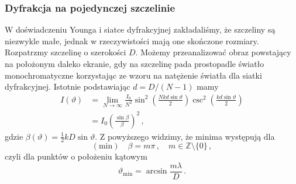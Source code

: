 \documentclass[../main.tex]{subfiles}
\begin{document}
\subsubsection{Dyfrakcja na pojedynczej szczelinie}
W doświadczeniu Younga i siatce dyfrakcyjnej zakładaliśmy, że szczeliny są niezwykle małe, jednak w
rzeczywistości mają one skończone rozmiary. Rozpatrzmy szczelinę o szerokości \(D\). Możemy
przeanalizować obraz powstający na położonym daleko ekranie, gdy na szczelinę pada prostopadle
światło monochromatyczne korzystając ze wzoru na natężenie światła dla siatki dyfrakcyjnej. Istotnie
podstawiając \(d=D/(N-1)\) mamy 
\begin{equation*}
\begin{split}
    I(\vartheta)&=\lim_{N\to\infty}\frac{I_0}{N^2}\sin^2\left(\frac{Nkd\sin\vartheta}{2}\right)\csc^2\left(\frac{kd\sin\vartheta}{2}\right)\\
    &=I_0\left(\frac{\sin\beta}{\beta}\right)^2\,,
\end{split}
\end{equation*}
gdzie \(\beta(\vartheta)=\frac{1}{2}kD\sin\vartheta\). Z powyższego widzimy, że minima występują dla 
\begin{equation*}
    (\text{min})\quad \beta=m\pi\,,\quad m\in\mathbb{Z}\setminus \{0\}\,,
\end{equation*}
czyli dla punktów o położeniu kątowym
\begin{equation*}
    \vartheta_\text{min}=\arcsin\frac{m\lambda}{D}\,.
\end{equation*}
\end{document}
